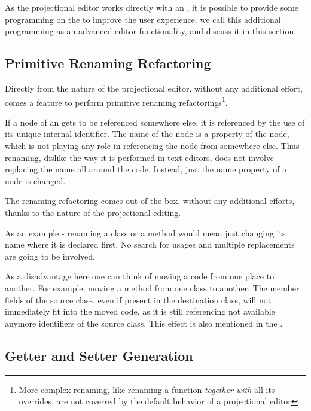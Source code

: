 
As the projectional editor works directly with an  , it is possible to provide some programming on the 
 to improve the user experience. we call this additional programming as an advanced editor functionality, and 
discuss it in this section.

\subsection{Primitive Renaming Refactoring}
Directly from the nature of the projectional editor, without any additional effort, comes a feature to 
perform primitive renaming refactorings\footnote{More complex renaming, like renaming a function \emph{together with} all its overrides,
are not coverred by the default behavior of a projectional editor}.

If a node of an  gets to be referenced somewhere else, it is referenced by the use of its unique internal
identifier. The name of the node is a property of the node, which is not playing any role in
referencing the node from somewhere else. Thus renaming, dislike the way it is performed in text
editors, does not involve replacing the name all around the code. Instead, just the name property 
of a node is changed.

The renaming refactoring comes out of the box, without any additional efforts, thanks to the nature of the
projectional editing.

As an example - renaming a class or a method would mean just changing its name where it is declared first.
No search for usages and multiple replacements are going to be involved.

As a disadvantage here one can think of moving a code from one place to another. For example, moving 
a method from one class to another. The member fields of the source class, even if present in the destination
class, will not immediately fit into the moved code, as it is still referencing not available anymore
identifiers of the source class. This effect is also mentioned in the .


\subsection{Getter and Setter Generation}
\label{getterandsetter}

